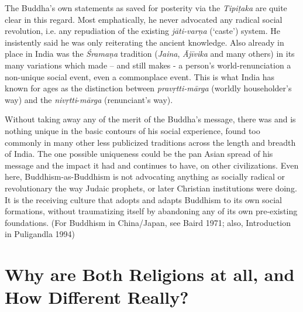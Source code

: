 The Buddha’s own statements as saved for posterity via the \textit{Tipiṭaka} are quite clear in this regard. Most emphatically, he never advocated any radical social revolution, i.e. any repudiation of the existing \textit{jāti-varṇa} (‘caste’) system. He insistently said he was only reiterating the ancient knowledge. Also already in place in India was the \textit{Śramaṇa} tradition (\textit{Jaina}, \textit{Ājīvika} and many others) in its many variations which made – and still makes - a person’s world-renunciation a non-unique social event, even a commonplace event. This is what India has known for ages as the distinction between \textit{pravṛtti-mārga} (worldly householder’s way) and the \textit{nivṛtti}-\textit{mārga} (renunciant’s way).

Without taking away any of the merit of the Buddha’s message, there was and is nothing unique in the basic contours of his social experience, found too commonly in many other less publicized traditions across the length and breadth of India. The one possible uniqueness could be the pan Asian spread of his message and the impact it had and continues to have, on other civilizations. Even here, Buddhism-as-Buddhism is not advocating anything as socially radical or revolutionary the way Judaic prophets, or later Christian institutions were doing. It is the receiving culture that adopts and adapts Buddhism to its own social formations, without traumatizing itself by abandoning any of its own pre-existing foundations. (For Buddhism in China/Japan, see Baird 1971; also, Introduction in Puligandla 1994)
 
\section*{Why are Both Religions at all, \hfill\break and How Different Really?}

